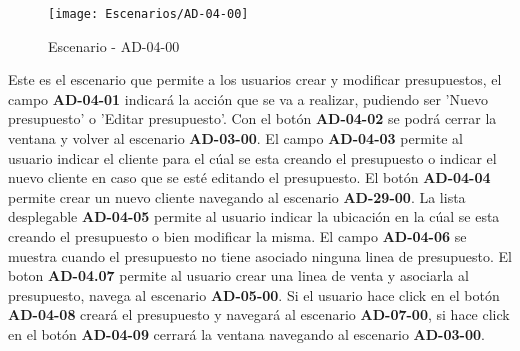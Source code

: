 \begin{figure}[H]
\centering
\texttt{[image: Escenarios/AD-04-00]}
\caption{Escenario - AD-04-00}
\label{fig:AD-04-00}
\end{figure}
Este es el escenario que permite a los usuarios crear y modificar presupuestos, el campo \textbf{AD-04-01} indicará la acción que se va a realizar, pudiendo ser 'Nuevo presupuesto' o 'Editar presupuesto'. Con el botón \textbf{AD-04-02} se podrá cerrar la ventana y volver al escenario \textbf{AD-03-00}.
El campo \textbf{AD-04-03} permite al usuario indicar el cliente para el cúal se esta creando el presupuesto o indicar el nuevo cliente en caso que se esté editando el presupuesto. El botón \textbf{AD-04-04} permite crear un nuevo cliente navegando al escenario \textbf{AD-29-00}. La lista desplegable \textbf{AD-04-05} permite al usuario indicar la ubicación en la cúal se esta creando el presupuesto o bien modificar la misma. El campo \textbf{AD-04-06} se muestra cuando el presupuesto no tiene asociado ninguna linea de presupuesto. El boton \textbf{AD-04.07} permite al usuario crear una linea de venta y asociarla al presupuesto, navega al escenario \textbf{AD-05-00}. Si el usuario hace click en el botón \textbf{AD-04-08} creará el presupuesto y navegará al escenario \textbf{AD-07-00}, si hace click en el botón \textbf{AD-04-09} cerrará la ventana navegando al escenario \textbf{AD-03-00}.
\clearpage
